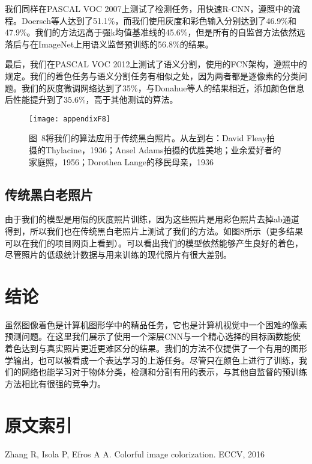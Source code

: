 我们同样在PASCAL VOC 2007上测试了检测任务，用快速R-CNN，遵照中的流程。Doersch等人达到了51.1\%，而我们使用灰度和彩色输入分别达到了46.9\%和47.9\%。我们的方法远高于强k均值基准线的45.6\%，但是所有的自监督方法依然远落后与在ImageNet上用语义监督预训练的56.8\%的结果。

最后，我们在PASCAL VOC 2012上测试了语义分割，使用的FCN架构，遵照中的规定。我们的着色任务与语义分割任务有相似之处，因为两者都是逐像素的分类问题。我们的灰度微调网络达到了35\%，与Donahue等人的结果相近，添加颜色信息后性能提升到了35.6\%，高于其他测试的算法。

\begin{figure}[h]
  \centering
  \texttt{[image: appendixF8]}
  \caption*{图~8\quad 将我们的算法应用于传统黑白照片。从左到右：David Fleay拍摄的Thylacine，1936；Ansel Adams拍摄的优胜美地；业余爱好者的家庭照，1956；Dorothea Lange的移民母亲，1936}
  \label{tab:badfigure10}
\end{figure}

\subsection{传统黑白老照片}

由于我们的模型是用假的灰度照片训练，因为这些照片是用彩色照片去掉ab通道得到，所以我们也在传统黑白老照片上测试了我们的方法。如图8所示（更多结果可以在我们的项目网页上看到）。可以看出我们的模型依然能够产生良好的着色，尽管照片的低级统计数据与用来训练的现代照片有很大差别。

\section{结论}

虽然图像着色是计算机图形学中的精品任务，它也是计算机视觉中一个困难的像素预测问题。在这里我们展示了使用一个深层CNN与一个精心选择的目标函数能使着色达到与真实照片更近更难区分的结果。我们的方法不仅提供了一个有用的图形学输出，也可以被看成一个表达学习的上游任务。尽管只在颜色上进行了训练，我们的网络也能学习对于物体分类，检测和分割有用的表示，与其他自监督的预训练方法相比有很强的竞争力。

\section*{原文索引}

\begin{translationbib}
  \item Zhang R, Isola P, Efros A A. Colorful image colorization. ECCV, 2016
\end{translationbib}